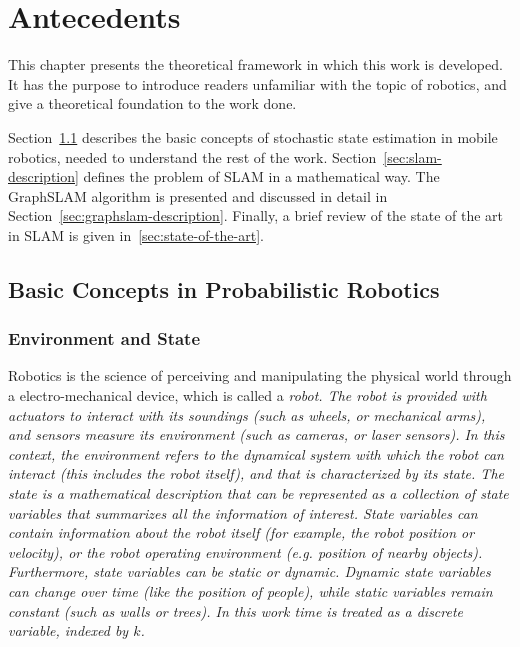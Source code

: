 \chapter{Antecedents}
\label{chap:antecedents}

This chapter presents the theoretical framework in which this work is developed. It has the purpose to introduce readers unfamiliar with the topic of robotics, and give a theoretical foundation to the work done.

Section~\ref{sec:basic-concepts} describes the basic concepts of stochastic state estimation in mobile robotics, needed to understand the rest of the work. Section~\ref{sec:slam-description} defines the problem of SLAM in a mathematical way. The GraphSLAM algorithm is presented and discussed in detail in Section~\ref{sec:graphslam-description}. Finally, a brief review of the state of the art in SLAM is given in~\ref{sec:state-of-the-art}.

\section{Basic Concepts in Probabilistic Robotics} 
\label{sec:basic-concepts}

\subsection{Environment and State}

Robotics is the science of perceiving and manipulating the physical world through a electro-mechanical device, which is called a \it{robot}. The robot is provided with actuators to interact with its soundings (such as wheels, or mechanical arms), and sensors measure its environment (such as cameras, or laser sensors). In this context, the \it{environment} refers to the dynamical system with which the robot can interact (this includes the robot itself), and that is characterized by its \it{state}. The state is a mathematical description that can be represented as a collection of \it{state variables} that summarizes all the information of interest. State variables can contain information about the robot itself (for example, the robot position or velocity), or the robot operating environment (e.g. position of nearby objects). Furthermore, state variables can be \it{static} or \it{dynamic}. Dynamic state variables can change over time (like the position of people), while static variables remain constant (such as walls or trees). In this work time is treated as a discrete variable, indexed by $k$.


